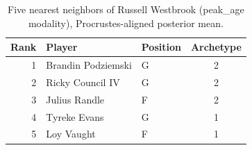 \begin{table}[htbp]
  \centering\small
  \begin{tabular}{rllc}
    \toprule
    Rank & Player & Position & Archetype \\
    \midrule
    1 & Brandin Podziemski & G & 2 \\
    2 & Ricky Council IV & G & 2 \\
    3 & Julius Randle & F & 2 \\
    4 & Tyreke Evans & G & 1 \\
    5 & Loy Vaught & F & 1 \\
    \bottomrule
  \end{tabular}
  \caption{Five nearest neighbors of Russell Westbrook (peak_age modality), Procrustes-aligned posterior mean.}
  \label{tab:Russell_Westbrook_neighbors_peak_age}
\end{table}

